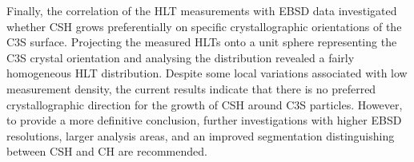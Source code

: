 Finally, the correlation of the \ac{HLT} measurements with \ac{EBSD} data investigated whether \ac{CSH} grows preferentially on specific crystallographic orientations of the \ac{C3S} surface.
Projecting the measured \ac{HLT}s onto a unit sphere representing the \ac{C3S} crystal orientation and analysing the distribution revealed a fairly homogeneous \ac{HLT} distribution.
Despite some local variations associated with low measurement density, the current results indicate that there is no preferred crystallographic direction for the growth of \ac{CSH} around \ac{C3S} particles.
However, to provide a more definitive conclusion, further investigations with higher \ac{EBSD} resolutions, larger analysis areas, and an improved segmentation distinguishing between \ac{CSH} and \ac{CH} are recommended.

